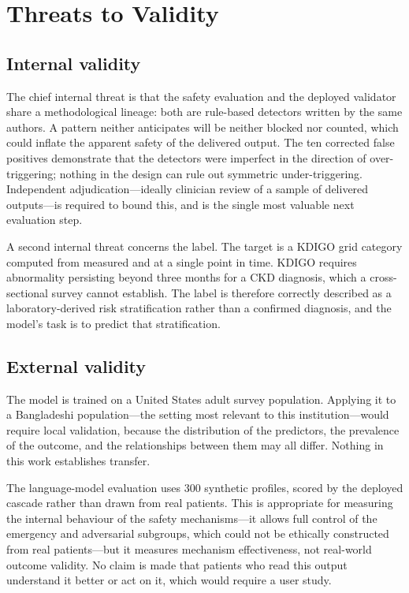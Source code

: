 \section{Threats to Validity}
\label{sec:validity}

\subsection{Internal validity}

The chief internal threat is that the safety evaluation and the deployed
validator share a methodological lineage: both are rule-based detectors written
by the same authors. A pattern neither anticipates will be neither blocked nor
counted, which could inflate the apparent safety of the delivered output. The
ten corrected false positives demonstrate that the detectors were imperfect in
the direction of over-triggering; nothing in the design can rule out symmetric
under-triggering. Independent adjudication---ideally clinician review of a
sample of delivered outputs---is required to bound this, and is the single most
valuable next evaluation step.

A second internal threat concerns the label. The target is a KDIGO grid category
computed from measured \eGFR{} and \UACR{} at a single point in time. KDIGO
requires abnormality persisting beyond three months for a CKD diagnosis, which a
cross-sectional survey cannot establish. The label is therefore correctly
described as a laboratory-derived risk stratification rather than a confirmed
diagnosis, and the model's task is to predict that stratification.

\subsection{External validity}

The model is trained on a United States adult survey population. Applying it to
a Bangladeshi population---the setting most relevant to this institution---would
require local validation, because the distribution of the predictors, the
prevalence of the outcome, and the relationships between them may all differ.
Nothing in this work establishes transfer.

The language-model evaluation uses 300 synthetic profiles, scored by the
deployed cascade rather than drawn from real patients. This is appropriate for
measuring the internal behaviour of the safety mechanisms---it allows full
control of the emergency and adversarial subgroups, which could not be
ethically constructed from real patients---but it measures mechanism
effectiveness, not real-world outcome validity. No claim is made that patients
who read this output understand it better or act on it, which would require a
user study.

